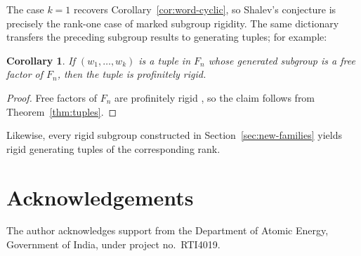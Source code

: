 \documentclass[11pt]{amsart}
\theoremstyle{plain}
\newtheorem{corollary}[theorem]{Corollary}
\theoremstyle{definition}
\begin{document}
The case $k=1$ recovers Corollary~\ref{cor:word-cyclic}, so Shalev's
conjecture is precisely the rank-one case of marked subgroup rigidity.  The
same dictionary transfers the preceding subgroup results to generating tuples;
for example:

\begin{corollary}\label{cor:freefactor-tuple}
If $(w_1,\dots,w_k)$ is a tuple in $F_n$ whose generated subgroup is a free
factor of $F_n$, then the tuple is profinitely rigid.
\end{corollary}

\begin{proof}
Free factors of $F_n$ are profinitely rigid \cite{PP}, so the claim follows from
Theorem~\ref{thm:tuples}.
\end{proof}

Likewise, every rigid subgroup constructed in
Section~\ref{sec:new-families} yields rigid generating tuples of the
corresponding rank.

\section*{Acknowledgements}

The author acknowledges support from the Department of Atomic Energy,
Government of India, under project no.~RTI4019.
\end{document}
